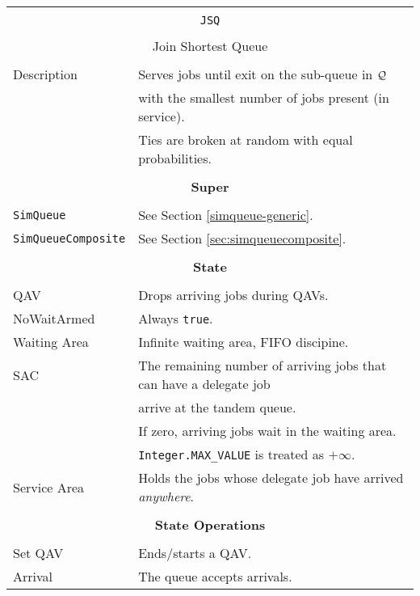 \begin{tabular}{|l|l|}
	\hline
	\multicolumn{2}{|c|}{} \\
	\multicolumn{2}{|c|}{\lstinline[basicstyle=\large]{JSQ}} \\
	\multicolumn{2}{|c|}{} \\
	\multicolumn{2}{|c|}{Join Shortest Queue} \\
	\multicolumn{2}{|c|}{} \\
	\hline
	Description & Serves jobs until exit on the sub-queue in $\cal{Q}$ \\
	& with the smallest number of jobs present (in service). \\
	& Ties are broken at random with equal probabilities. \\
	\hline
	\multicolumn{2}{|c|}{} \\
	\multicolumn{2}{|c|}{\bf Super} \\
	\multicolumn{2}{|c|}{} \\
	\hline
	\lstinline|SimQueue| & See Section \ref{simqueue-generic}. \\
	\lstinline|SimQueueComposite| & See Section \ref{sec:simqueuecomposite}. \\
	\hline
	\multicolumn{2}{|c|}{} \\
	\multicolumn{2}{|c|}{\bf State} \\
	\multicolumn{2}{|c|}{} \\
	\hline
	QAV & Drops arriving jobs during QAVs. \\
	\hline
	NoWaitArmed & Always \lstinline|true|. \\
	\hline
	Waiting Area & Infinite waiting area, FIFO discipine. \\
	\hline
	SAC & The remaining number of arriving jobs that can have a delegate job \\
	& arrive at the tandem queue. \\
	& If zero, arriving jobs wait in the waiting area. \\
	& \lstinline|Integer.MAX_VALUE| is treated as $+\infty$. \\
	\hline
	Service Area & Holds the jobs whose delegate job have arrived {\em anywhere}. \\
	\hline
	\multicolumn{2}{|c|}{} \\
	\multicolumn{2}{|c|}{\bf State Operations} \\
	\multicolumn{2}{|c|}{} \\
	\hline
	Set QAV & Ends/starts a QAV. \\
	\hline
	Arrival & The queue accepts arrivals. \\

\end{tabular}
